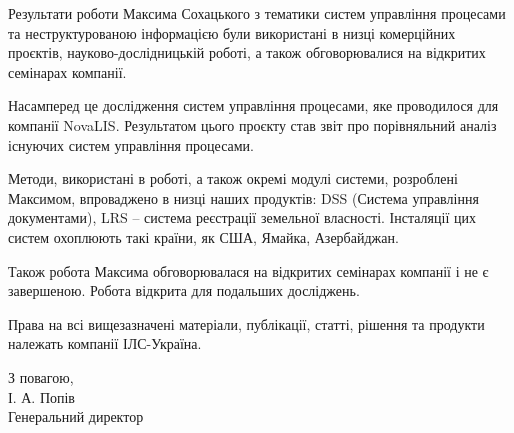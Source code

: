 \documentclass{memoir}
\begin{document}
    \normalsize
    Результати роботи Максима Сохацького з тематики систем управління процесами та неструктурованою інформацією були використані в низці комерційних проєктів, науково-дослідницькій роботі, а також обговорювалися на відкритих семінарах компанії.

    Насамперед це дослідження систем управління процесами, яке проводилося для компанії NovaLIS. Результатом цього проєкту став звіт про порівняльний аналіз існуючих систем управління процесами.

    Методи, використані в роботі, а також окремі модулі системи, розроблені Максимом, впроваджено в низці наших продуктів: DSS (Система управління документами), LRS – система реєстрації земельної власності. Інсталяції цих систем охоплюють такі країни, як США, Ямайка, Азербайджан.

    Також робота Максима обговорювалася на відкритих семінарах компанії і не є завершеною. Робота відкрита для подальших досліджень.

    Права на всі вищезазначені матеріали, публікації, статті, рішення та продукти належать компанії ІЛС-Україна.

\vspace{1cm}

    З повагою,\\[0.5cm]
    І. А. Попів\\
    Генеральний директор
\end{document}
